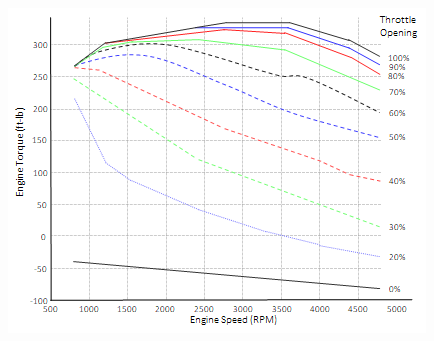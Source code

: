 \begin{enumerate}
\begin{figure}[!htb]
\begin{center}
\includegraphics[scale=0.280]{img/longitudinal_control/image_q12.png}
\end{center}
\label{image_q12}
\end{figure}
\end{enumerate}


